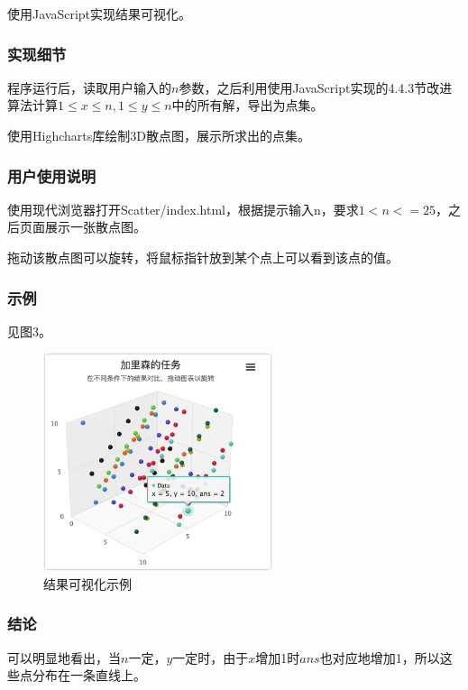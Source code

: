 \documentclass{article}
\begin{document}
使用JavaScript实现结果可视化。

\subsubsection{实现细节}

程序运行后，读取用户输入的$n$参数，之后利用使用JavaScript实现的4.4.3节改进算法计算$1 \leq x\leq n,1\leq y\leq n$中的所有解，导出为点集。

使用Highcharts库绘制3D散点图，展示所求出的点集。

\subsubsection{用户使用说明}

使用现代浏览器打开Scatter/index.html，根据提示输入n，要求$1 < n <= 25$，之后页面展示一张散点图。

拖动该散点图可以旋转，将鼠标指针放到某个点上可以看到该点的值。

\subsubsection{示例}

见图3。

\begin{figure}[htbp]
    
    \centering\includegraphics[width=0.6\textwidth]{./Images/Scatter.png}
    
    \caption{结果可视化示例}
    
\end{figure}

\subsubsection{结论}

可以明显地看出，当$n$一定，$y$一定时，由于$x$增加1时$ans$也对应地增加1，所以这些点分布在一条直线上。
\end{document}
